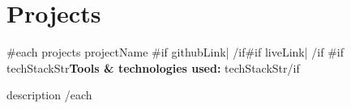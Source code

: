 \section{Projects}
\vspace{0pt}
\resumeSubHeadingListStart

{{#each projects}}
\resumeProject
  { {{projectName}} {{#if githubLink}}| \href{ {{githubLink}} }{\faGithub} {{/if}}{{#if liveLink}}| \href{ {{liveLink}} }{\faLink}{{/if}} }
  { {{#if techStackStr}}\textbf{Tools \& technologies used:} {{techStackStr}}{{/if}} }
  {}
  {}

  \resumeItemListStart
    \item {{description}}
  \resumeItemListEnd
{{/each}}

\resumeSubHeadingListEnd
\vspace{-5.5mm}
